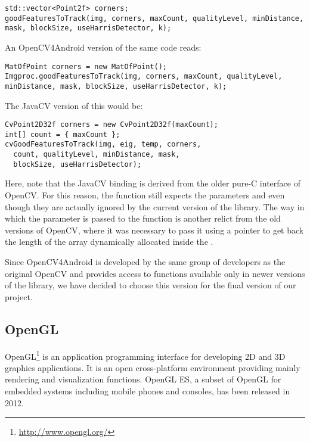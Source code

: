 \begin{lstlisting} 
std::vector<Point2f> corners; 
goodFeaturesToTrack(img, corners, maxCount, qualityLevel, minDistance, mask, blockSize, useHarrisDetector, k);
\end{lstlisting}

An OpenCV4Android version of the same code reads: 

\begin{lstlisting} 
MatOfPoint corners = new MatOfPoint();
Imgproc.goodFeaturesToTrack(img, corners, maxCount, qualityLevel, minDistance, mask, blockSize, useHarrisDetector, k);
\end{lstlisting} 

The JavaCV version of this would be: 

\begin{lstlisting} 
CvPoint2D32f corners = new CvPoint2D32f(maxCount);
int[] count = { maxCount };
cvGoodFeaturesToTrack(img, eig, temp, corners,
  count, qualityLevel, minDistance, mask,
  blockSize, useHarrisDetector);
\end{lstlisting}

Here, note that the JavaCV binding is derived from the older pure-C interface of OpenCV. 
For this reason, the function still expects the parameters  and  even though they are actually ignored by the current version of the library. 
The way in which the  parameter is passed to the function is another relict from the old versions of OpenCV, where it was necessary to pass it using a pointer to get back the length of the array  dynamically allocated inside the .

Since OpenCV4Android is developed by the same group of developers as the original OpenCV and provides access to functions available only in newer versions of the library, we have decided to choose this version for the final version of our project. 

\subsection{OpenGL} 

OpenGL\footnote{\url{http://www.opengl.org/}} is an application programming interface for developing 2D and 3D graphics applications.
It is an open cross-platform environment providing mainly rendering and visualization functions.
OpenGL ES, a subset of OpenGL for embedded systems including mobile phones and consoles, has been released in 2012. 

